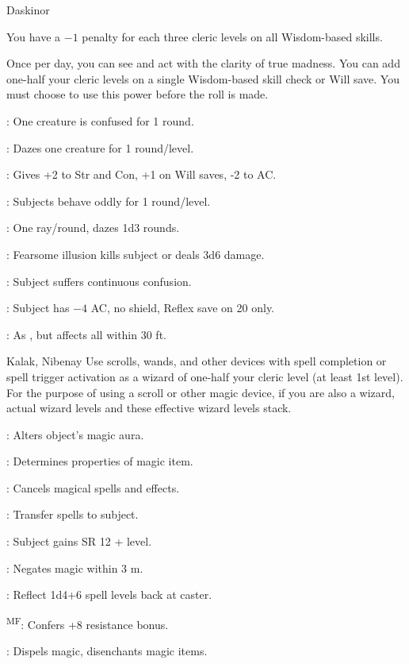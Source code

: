 {Daskinor}
{You have a $-1$ penalty for each three cleric levels on all Wisdom-based skills.

Once per day, you can see and act with the clarity of true madness. You can add one-half your cleric levels on a single Wisdom-based skill check or Will save. You must choose to use this power before the roll is made.}
{
	\item {}: One creature is confused for 1 round.
	\item {}: Dazes one creature for 1 round/level.
	\item {}: Gives +2 to Str and Con, +1 on Will saves, -2 to AC.
	\item {}: Subjects behave oddly for 1 round/level.
	\item {}: One ray/round, dazes 1d3 rounds.
	\item {}: Fearsome illusion kills subject or deals 3d6 damage.
	\item {}: Subject suffers continuous confusion.
	\item {}: Subject has $-4$ AC, no shield, Reflex save on 20 only.
	\item {}: As , but affects all within 30 ft.
}

{Kalak, Nibenay}
{Use scrolls, wands, and other devices with spell completion or spell trigger activation as a wizard of one-half your cleric level (at least 1st level). For the purpose of using a scroll or other magic device, if you are also a wizard, actual wizard levels and these effective wizard levels stack.}
{
	\item {}: Alters object's magic aura.
	\item {}: Determines properties of magic item.
	\item {}: Cancels magical spells and effects.
	\item {}: Transfer spells to subject.
	\item {}: Subject gains SR 12 + level.
	\item {}: Negates magic within 3 m.
	\item {}: Reflect 1d4+6 spell levels back at caster.
	\item {}\textsuperscript{M}\textsuperscript{F}: Confers +8 resistance bonus.
	\item {}: Dispels magic, disenchants magic items.
}

